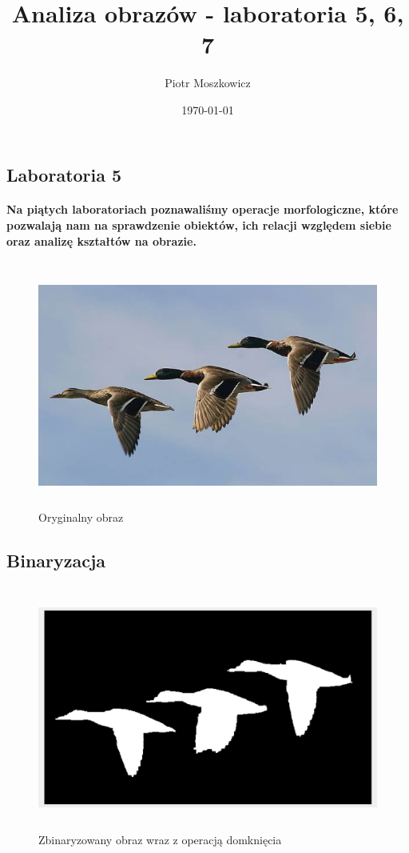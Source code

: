 \documentclass[a4paper,12pt]{article}
\begin{document}
\title{Analiza obrazów - laboratoria 5, 6, 7}
\author{Piotr Moszkowicz} 
\date{\today}
\maketitle
{}

\newpage
\begin{justify}
\tableofcontents
\newpage
{}

\section{Laboratoria 5}

\paragraph{Na piątych laboratoriach poznawaliśmy operacje morfologiczne, które pozwalają nam na sprawdzenie obiektów, ich relacji względem siebie oraz analizę kształtów na obrazie.}

\begin{figure}[h]
\centering
\includegraphics[width=12cm, height=8cm]{kaczki}
\caption{Oryginalny obraz}
\end{figure}

\subsection{Binaryzacja}

\begin{figure}[h]
\centering
\includegraphics[width=12cm, height=8cm]{1}
\caption{Zbinaryzowany obraz wraz z operacją domknięcia}
\end{figure}


\end{justify}
\end{document}
